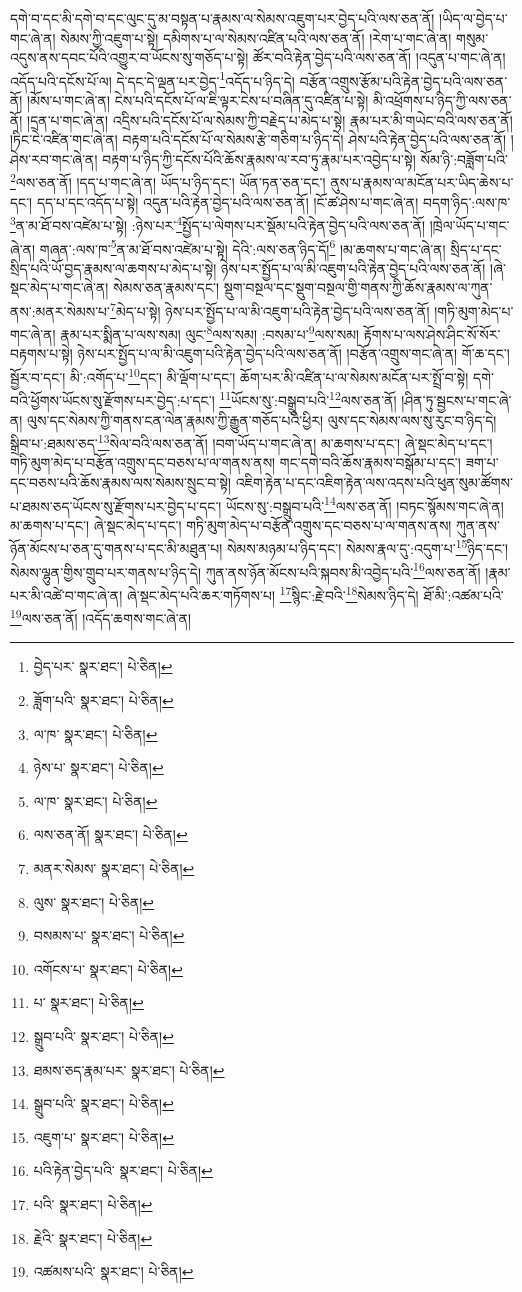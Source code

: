 དགེ་བ་དང་མི་དགེ་བ་དང་ལུང་དུ་མ་བསྟན་པ་རྣམས་ལ་སེམས་འཇུག་པར་བྱེད་པའི་ལས་ཅན་ནོ། །ཡིད་ལ་བྱེད་པ་གང་ཞེ་ན། སེམས་ཀྱི་འཇུག་པ་སྟེ། དམིགས་པ་ལ་སེམས་འཛིན་པའི་ལས་ཅན་ནོ། །རེག་པ་གང་ཞེ་ན། གསུམ་འདུས་ནས་དབང་པོའི་འགྱུར་བ་ཡོངས་སུ་གཅོད་པ་སྟེ། ཚོར་བའི་རྟེན་བྱེད་པའི་ལས་ཅན་ནོ། །འདུན་པ་གང་ཞེ་ན། འདོད་པའི་དངོས་པོ་ལ། དེ་དང་དེ་ལྡན་པར་བྱེད་\footnote{བྱེད་པར་  སྣར་ཐང་།  པེ་ཅིན། }འདོད་པ་ཉིད་དེ། བརྩོན་འགྲུས་རྩོམ་པའི་རྟེན་བྱེད་པའི་ལས་ཅན་ནོ། །མོས་པ་གང་ཞེ་ན། ངེས་པའི་དངོས་པོ་ལ་ཇི་ལྟར་ངེས་པ་བཞིན་དུ་འཛིན་པ་སྟེ། མི་འཕྲོགས་པ་ཉིད་ཀྱི་ལས་ཅན་ནོ། །དྲན་པ་གང་ཞེ་ན། འདྲིས་པའི་དངོས་པོ་ལ་སེམས་ཀྱི་བརྗེད་པ་མེད་པ་སྟེ། རྣམ་པར་མི་གཡེང་བའི་ལས་ཅན་ནོ། །ཏིང་ངེ་འཛིན་གང་ཞེ་ན། བརྟག་པའི་དངོས་པོ་ལ་སེམས་རྩེ་གཅིག་པ་ཉིད་དེ། ཤེས་པའི་རྟེན་བྱེད་པའི་ལས་ཅན་ནོ། །ཤེས་རབ་གང་ཞེ་ན། བརྟག་པ་ཉིད་ཀྱི་དངོས་པོའི་ཆོས་རྣམས་ལ་རབ་ཏུ་རྣམ་པར་འབྱེད་པ་སྟེ། སོམ་ཉི་:བཟློག་པའི་\footnote{ཟློག་པའི་  སྣར་ཐང་།  པེ་ཅིན། }ལས་ཅན་ནོ། །དད་པ་གང་ཞེ་ན། ཡོད་པ་ཉིད་དང་། ཡོན་ཏན་ཅན་དང་། ནུས་པ་རྣམས་ལ་མངོན་པར་ཡིད་ཆེས་པ་དང་། དད་པ་དང་འདོད་པ་སྟེ། འདུན་པའི་རྟེན་བྱེད་པའི་ལས་ཅན་ནོ། །ངོ་ཚ་ཤེས་པ་གང་ཞེ་ན། བདག་ཉིད་:ལས་ཁ་\footnote{ལ་ཁ་  སྣར་ཐང་།  པེ་ཅིན། }ན་མ་ཐོ་བས་འཛེམ་པ་སྟེ། :ཉེས་པར་\footnote{ཉེས་པ་  སྣར་ཐང་།  པེ་ཅིན། }སྤྱོད་པ་ལེགས་པར་སྡོམ་པའི་རྟེན་བྱེད་པའི་ལས་ཅན་ནོ། །ཁྲེལ་ཡོད་པ་གང་ཞེ་ན། གཞན་:ལས་ཁ་\footnote{ལ་ཁ་  སྣར་ཐང་།  པེ་ཅིན། }ན་མ་ཐོ་བས་འཛེམ་པ་སྟེ། དེའི་:ལས་ཅན་ཉིད་དོ།\footnote{ལས་ཅན་ནོ།  སྣར་ཐང་།  པེ་ཅིན། } །མ་ཆགས་པ་གང་ཞེ་ན། སྲིད་པ་དང་སྲིད་པའི་ཡོ་བྱད་རྣམས་ལ་ཆགས་པ་མེད་པ་སྟེ། ཉེས་པར་སྤྱོད་པ་ལ་མི་འཇུག་པའི་རྟེན་བྱེད་པའི་ལས་ཅན་ནོ། །ཞེ་སྡང་མེད་པ་གང་ཞེ་ན། སེམས་ཅན་རྣམས་དང་། སྡུག་བསྔལ་དང་སྡུག་བསྔལ་གྱི་གནས་ཀྱི་ཆོས་རྣམས་ལ་ཀུན་ནས་:མནར་སེམས་པ་\footnote{མནར་སེམས་  སྣར་ཐང་།  པེ་ཅིན། }མེད་པ་སྟེ། ཉེས་པར་སྤྱོད་པ་ལ་མི་འཇུག་པའི་རྟེན་བྱེད་པའི་ལས་ཅན་ནོ། །གཏི་མུག་མེད་པ་གང་ཞེ་ན། རྣམ་པར་སྨིན་པ་ལས་སམ། ལུང་\footnote{ལུས་  སྣར་ཐང་།  པེ་ཅིན། }ལས་སམ། :བསམ་པ་\footnote{བསམས་པ་  སྣར་ཐང་།  པེ་ཅིན། }ལས་སམ། རྟོགས་པ་ལས་ཤེས་ཤིང་སོ་སོར་བརྟགས་པ་སྟེ། ཉེས་པར་སྤྱོད་པ་ལ་མི་འཇུག་པའི་རྟེན་བྱེད་པའི་ལས་ཅན་ནོ། །བརྩོན་འགྲུས་གང་ཞེ་ན། གོ་ཆ་དང་། སྦྱོར་བ་དང་། མི་:འགོད་པ་\footnote{འགོངས་པ་  སྣར་ཐང་།  པེ་ཅིན། }དང་། མི་ལྡོག་པ་དང་། ཆོག་པར་མི་འཛིན་པ་ལ་སེམས་མངོན་པར་སྤྲོ་བ་སྟེ། དགེ་བའི་ཕྱོགས་ཡོངས་སུ་རྫོགས་པར་བྱེད་:པ་དང་། \footnote{པ་  སྣར་ཐང་།  པེ་ཅིན། }ཡོངས་སུ་:བསྒྲུབ་པའི་\footnote{སྒྲུབ་པའི་  སྣར་ཐང་།  པེ་ཅིན། }ལས་ཅན་ནོ། །ཤིན་ཏུ་སྦྱངས་པ་གང་ཞེ་ན། ལུས་དང་སེམས་ཀྱི་གནས་ངན་ལེན་རྣམས་ཀྱི་རྒྱུན་གཅོད་པའི་ཕྱིར། ལུས་དང་སེམས་ལས་སུ་རུང་བ་ཉིད་དེ། སྒྲིབ་པ་:ཐམས་ཅད་\footnote{ཐམས་ཅད་རྣམ་པར་  སྣར་ཐང་།  པེ་ཅིན། }སེལ་བའི་ལས་ཅན་ནོ། །བག་ཡོད་པ་གང་ཞེ་ན། མ་ཆགས་པ་དང་། ཞེ་སྡང་མེད་པ་དང་། གཏི་མུག་མེད་པ་བརྩོན་འགྲུས་དང་བཅས་པ་ལ་གནས་ནས། གང་དགེ་བའི་ཆོས་རྣམས་བསྒོམ་པ་དང་། ཟག་པ་དང་བཅས་པའི་ཆོས་རྣམས་ལས་སེམས་སྲུང་བ་སྟེ། འཇིག་རྟེན་པ་དང་འཇིག་རྟེན་ལས་འདས་པའི་ཕུན་སུམ་ཚོགས་པ་ཐམས་ཅད་ཡོངས་སུ་རྫོགས་པར་བྱེད་པ་དང་། ཡོངས་སུ་:བསྒྲུབ་པའི་\footnote{སྒྲུབ་པའི་  སྣར་ཐང་།  པེ་ཅིན། }ལས་ཅན་ནོ། །བཏང་སྙོམས་གང་ཞེ་ན། མ་ཆགས་པ་དང་། ཞེ་སྡང་མེད་པ་དང་། གཏི་མུག་མེད་པ་བརྩོན་འགྲུས་དང་བཅས་པ་ལ་གནས་ནས། ཀུན་ནས་ཉོན་མོངས་པ་ཅན་དུ་གནས་པ་དང་མི་མཐུན་པ། སེམས་མཉམ་པ་ཉིད་དང་། སེམས་རྣལ་དུ་:འདུག་པ་\footnote{འཇུག་པ་  སྣར་ཐང་།  པེ་ཅིན། }ཉིད་དང་། སེམས་ལྷུན་གྱིས་གྲུབ་པར་གནས་པ་ཉིད་དེ། ཀུན་ནས་ཉོན་མོངས་པའི་སྐབས་མི་འབྱེད་པའི་\footnote{པའི་རྟེན་བྱེད་པའི་  སྣར་ཐང་།  པེ་ཅིན། }ལས་ཅན་ནོ། །རྣམ་པར་མི་འཚེ་བ་གང་ཞེ་ན། ཞེ་སྡང་མེད་པའི་ཆར་གཏོགས་པ། \footnote{པའི་  སྣར་ཐང་།  པེ་ཅིན། }སྙིང་:རྗེ་བའི་\footnote{རྗེའི་  སྣར་ཐང་།  པེ་ཅིན། }སེམས་ཉིད་དེ། ཐོ་མི་:འཚམ་པའི་\footnote{འཚམས་པའི་  སྣར་ཐང་།  པེ་ཅིན། }ལས་ཅན་ནོ། །འདོད་ཆགས་གང་ཞེ་ན། 
